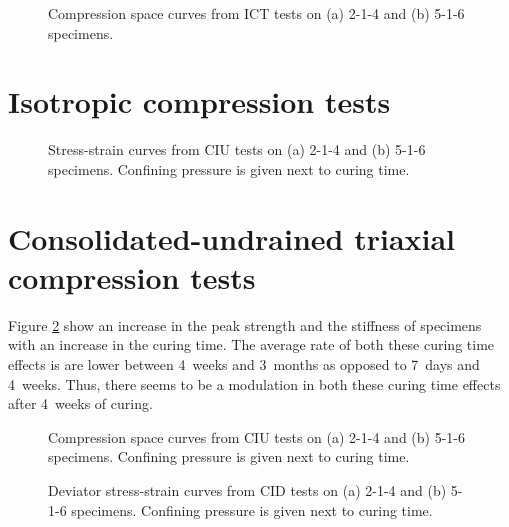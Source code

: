 \documentclass{nuropc}
\begin{document}
\begin{figure}[htbp]
\begin{center}

\end{center}
\begin{center}

\end{center}
\caption{Compression space curves from ICT tests on (a) 2-1-4 and (b) 5-1-6 
         specimens.}
\label{fig:ICT}
\end{figure}

\section{Isotropic compression tests}


\begin{figure}[htbp]
\begin{center}

\end{center}
\begin{center}

\end{center}
\caption{Stress-strain curves from CIU tests on (a) 2-1-4 and (b) 5-1-6 
         specimens. Confining pressure is given next to curing time.}
\label{fig:CIU}
\end{figure}

\section{Consolidated-undrained triaxial compression tests}
Figure \ref{fig:CIU} show an increase in 
the peak strength and the stiffness of specimens
with an increase in the curing time.
The average rate of both these curing time effects 
is are lower between 4~weeks and 3~months 
as opposed to 7~days and 4~weeks.
Thus, there seems to be a modulation in
both these curing time effects after 4~weeks of curing.

\begin{figure}[htbp]
\begin{center}

\end{center}
\begin{center}

\end{center}
\caption{Compression space curves from CIU tests on (a) 2-1-4 and (b) 5-1-6 
         specimens. Confining pressure is given next to curing time.}
\label{fig:CID-vol}
\end{figure}

\begin{figure}[htbp]
\begin{center}

\end{center}
\begin{center}

\end{center}
\caption{Deviator stress-strain curves from CID tests on 
         (a) 2-1-4 and (b) 5-1-6 specimens. 
         Confining pressure is given next to curing time.}
\label{fig:CID-dev}
\end{figure}
\end{document}
